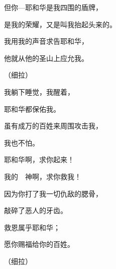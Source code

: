 {\BB \par }{\Q {}但你—耶和华是我四围的盾牌，
\par }{\Q 是我的荣耀，又是叫我抬起头来的。
\par }{\Q {}我用我的声音求告耶和华，
\par }{\Q 他就从他的圣山上应允我。
\par }{\QS （细拉）
\par }
{\BB \par }{\Q {}我躺下睡觉，我醒着，
\par }{\Q 耶和华都保佑我。
\par }{\Q {}虽有成万的百姓来周围攻击我，
\par }{\Q 我也不怕。
\par }{\Q {}耶和华啊，求你起来！
\par }{\Q 我的　神啊，求你救我！
\par }{\Q 因为你打了我一切仇敌的腮骨，
\par }{\Q 敲碎了恶人的牙齿。
\par }{\Q {}救恩属乎耶和华；
\par }{\Q 愿你赐福给你的百姓。
\par }{\QS （细拉）
\par }

